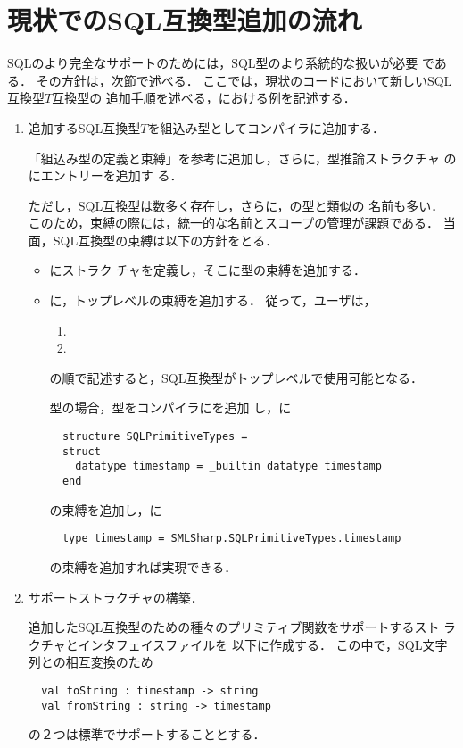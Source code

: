\section{現状でのSQL互換型追加の流れ}
	SQLのより完全なサポートのためには，SQL型のより系統的な扱いが必要
である．
	その方針は，次節で述べる．
	ここでは，現状のコードにおいて新しいSQL互換型$T$互換型の
追加手順を述べる，における例を記述する．
\begin{enumerate}

\item 追加するSQL互換型$T$を組込み型としてコンパイラに追加する．

	「組込み型の定義と束縛」を参考に追加し，さらに，型推論ストラクチャ
のにエントリーを追加す
る．

	ただし，SQL互換型は数多く存在し，さらに，\smlsharp{}の型と類似の
名前も多い．
	このため，束縛の際には，統一的な名前とスコープの管理が課題である．
	当面，SQL互換型の束縛は以下の方針をとる．
\begin{itemize}
\item {}にストラク
チャを定義し，そこに型の束縛を追加する．
\item {}に，トップレベルの束縛を追加する．
	従って，ユーザは，
\begin{enumerate}
\item {}
\item {}
\end{enumerate}
の順で記述すると，SQL互換型がトップレベルで使用可能となる．

	型の場合，型をコンパイラにを追加
し，に
\begin{verbatim}
  structure SQLPrimitiveTypes =
  struct
    datatype timestamp = _builtin datatype timestamp
  end
\end{verbatim}
の束縛を追加し，に
\begin{verbatim}
  type timestamp = SMLSharp.SQLPrimitiveTypes.timestamp
\end{verbatim}
の束縛を追加すれば実現できる．

\end{itemize}
\item サポートストラクチャの構築．

	追加したSQL互換型のための種々のプリミティブ関数をサポートするスト
ラクチャとインタフェイスファイルを
以下に作成する．
	この中で，SQL文字列との相互変換のため
\begin{verbatim}
  val toString : timestamp -> string
  val fromString : string -> timestamp
\end{verbatim}
の２つは標準でサポートすることとする．


\end{enumerate}
